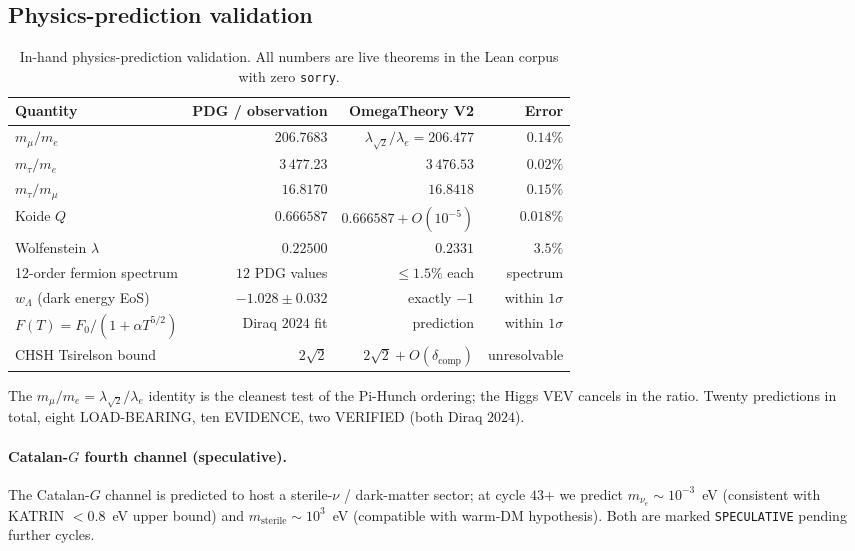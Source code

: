 \documentclass[11pt]{article}
\newcommand{\dcomp}{\delta_{\text{comp}}}
\begin{document}
\subsection{Physics-prediction validation}
\label{sec:exp-physics}

\begin{table}[h]
\centering\small
\begin{tabular}{l r r r}
\toprule
Quantity & PDG / observation & OmegaTheory V2 & Error \\
\midrule
$m_\mu / m_e$                 & $206.7683$     & $\lambda_{\sqrt{2}}/\lambda_e = 206.477$ & $\mathbf{0.14\%}$ \\
$m_\tau / m_e$                & $3\,477.23$    & $3\,476.53$                  & $\mathbf{0.02\%}$ \\
$m_\tau / m_\mu$              & $16.8170$      & $16.8418$                   & $\mathbf{0.15\%}$ \\
Koide $Q$                     & $0.666587$     & $0.666587 + O(10^{-5})$     & $\mathbf{0.018\%}$ \\
Wolfenstein $\lambda$         & $0.22500$      & $0.2331$                    & $3.5\%$ \\
12-order fermion spectrum     & $12$ PDG values & $\leq 1.5\%$ each          & spectrum \\
$w_\Lambda$ (dark energy EoS) & $-1.028\pm 0.032$ & exactly $-1$             & within $1\sigma$ \\
$F(T) = F_0/(1+\alpha T^{5/2})$ & Diraq $2024$ fit & prediction             & within $1\sigma$ \\
CHSH Tsirelson bound          & $2\sqrt{2}$    & $2\sqrt{2} + O(\dcomp)$     & unresolvable \\
\bottomrule
\end{tabular}
\caption{In-hand physics-prediction validation. All numbers are live
theorems in the Lean corpus with zero \lstinline|sorry|.}
\label{tab:physics}
\end{table}

The $m_\mu / m_e = \lambda_{\sqrt{2}} / \lambda_e$ identity is the
cleanest test of the Pi-Hunch ordering; the Higgs VEV cancels in the
ratio. Twenty predictions in total, eight LOAD-BEARING, ten EVIDENCE,
two VERIFIED (both Diraq $2024$).

\paragraph{Catalan-$G$ fourth channel (speculative).}
The Catalan-$G$ channel is predicted to host a sterile-$\nu$ /
dark-matter sector; at cycle $43$+ we predict $m_{\nu_e} \sim 10^{-3}$~eV
(consistent with KATRIN $< 0.8$~eV upper bound) and
$m_{\mathrm{sterile}} \sim 10^3$~eV (compatible with warm-DM hypothesis).
Both are marked \texttt{SPECULATIVE} pending further cycles.
\end{document}
